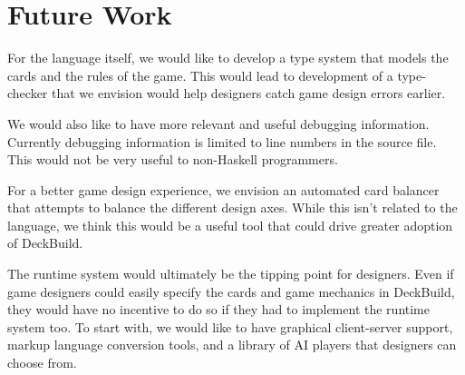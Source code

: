 
\section{Future Work}
\label{sec:future}

For the language itself, we would like to develop a type system that models the
cards and the rules of the game. This would lead to development of a
type-checker that we envision would help designers catch game design errors
earlier.

We would also like to have more relevant and useful debugging information.
Currently debugging information is limited to line numbers in the source file.
This would not be very useful to non-Haskell programmers.

For a better game design experience, we envision an automated card balancer that
attempts to balance the different design axes. While this isn't related to the
language, we think this would be a useful tool that could drive greater adoption
of DeckBuild.

The runtime system would ultimately be the tipping point for designers. Even if
game designers could easily specify the cards and game mechanics in DeckBuild,
they would have no incentive to do so if they had to implement the runtime
system too. To start with, we would like to have graphical client-server
support, markup language conversion tools, and a library of AI players that
designers can choose from.
